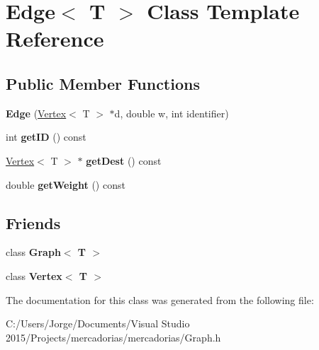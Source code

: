 \hypertarget{class_edge}{}\section{Edge$<$ T $>$ Class Template Reference}
\label{class_edge}
\subsection*{Public Member Functions}
\begin{DoxyCompactItemize}
\item 
{\bfseries Edge} (\hyperlink{class_vertex}{Vertex}$<$ T $>$ $\ast$d, double w, int identifier)\hypertarget{class_edge_a14ad4b1e17381ea530c075ee56a70eed}{}\label{class_edge_a14ad4b1e17381ea530c075ee56a70eed}

\item 
int {\bfseries get\+ID} () const \hypertarget{class_edge_acd2f78a9b5490796729b5c145ad7e926}{}\label{class_edge_acd2f78a9b5490796729b5c145ad7e926}

\item 
\hyperlink{class_vertex}{Vertex}$<$ T $>$ $\ast$ {\bfseries get\+Dest} () const \hypertarget{class_edge_a3805fa2e04f1e7f0495fbba6524ea823}{}\label{class_edge_a3805fa2e04f1e7f0495fbba6524ea823}

\item 
double {\bfseries get\+Weight} () const \hypertarget{class_edge_a78f814ec429f84cd7336402326ad4ea8}{}\label{class_edge_a78f814ec429f84cd7336402326ad4ea8}

\end{DoxyCompactItemize}
\subsection*{Friends}
\begin{DoxyCompactItemize}
\item 
class {\bfseries Graph$<$ T $>$}\hypertarget{class_edge_aefa9b76cd57411c5354e5620dc2d84dd}{}\label{class_edge_aefa9b76cd57411c5354e5620dc2d84dd}

\item 
class {\bfseries Vertex$<$ T $>$}\hypertarget{class_edge_a2e120a12dec663fa334633b4f26cbed8}{}\label{class_edge_a2e120a12dec663fa334633b4f26cbed8}

\end{DoxyCompactItemize}


The documentation for this class was generated from the following file\+:\begin{DoxyCompactItemize}
\item 
C\+:/\+Users/\+Jorge/\+Documents/\+Visual Studio 2015/\+Projects/mercadorias/mercadorias/Graph.\+h\end{DoxyCompactItemize}
